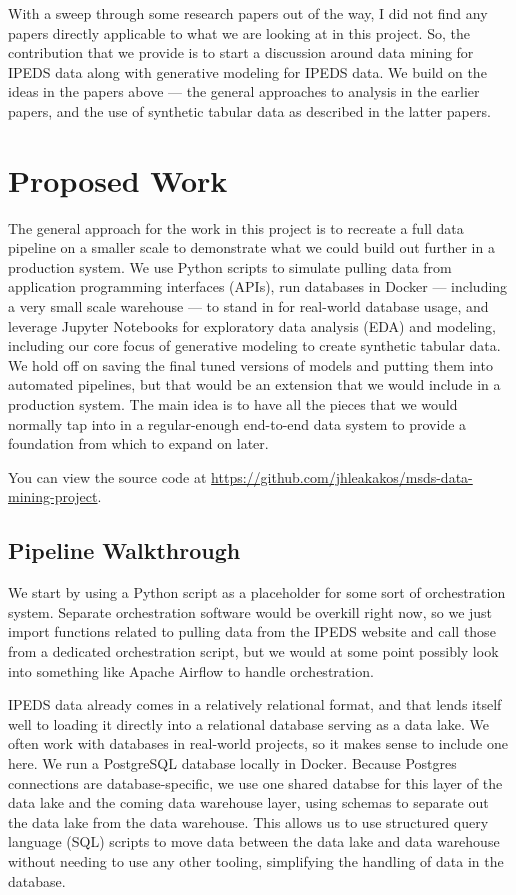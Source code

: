 \documentclass[sigconf, authorversion, nonacm]{acmart}
\begin{document}
    With a sweep through some research papers out of the way, I did not find any papers directly applicable to what we are looking at in this project. So, the contribution that we provide is to start a discussion around data mining for IPEDS data along with generative modeling for IPEDS data. We build on the ideas in the papers above --- the general approaches to analysis in the earlier papers, and the use of synthetic tabular data as described in the latter papers.

\section{Proposed Work}

    The general approach for the work in this project is to recreate a full data pipeline on a smaller scale to demonstrate what we could build out further in a production system. We use Python scripts to simulate pulling data from application programming interfaces (APIs), run databases in Docker --- including a very small scale warehouse --- to stand in for real-world database usage, and leverage Jupyter Notebooks for exploratory data analysis (EDA) and modeling, including our core focus of generative modeling to create synthetic tabular data. We hold off on saving the final tuned versions of models and putting them into automated pipelines, but that would be an extension that we would include in a production system. The main idea is to have all the pieces that we would normally tap into in a regular-enough end-to-end data system to provide a foundation from which to expand on later.

    You can view the source code at \href{https://github.com/jhleakakos/msds-data-mining-project}{https://github.com/jhleakakos/msds-data-mining-project}.

    \subsection{Pipeline Walkthrough}
        We start by using a Python script as a placeholder for some sort of orchestration system. Separate orchestration software would be overkill right now, so we just import functions related to pulling data from the IPEDS website and call those from a dedicated orchestration script, but we would at some point possibly look into something like Apache Airflow to handle orchestration.

        IPEDS data already comes in a relatively relational format, and that lends itself well to loading it directly into a relational database serving as a data lake. We often work with databases in real-world projects, so it makes sense to include one here. We run a PostgreSQL database locally in Docker. Because Postgres connections are database-specific, we use one shared databse for this layer of the data lake and the coming data warehouse layer, using schemas to separate out the data lake from the data warehouse. This allows us to use structured query language (SQL) scripts to move data between the data lake and data warehouse without needing to use any other tooling, simplifying the handling of data in the database.
\end{document}

